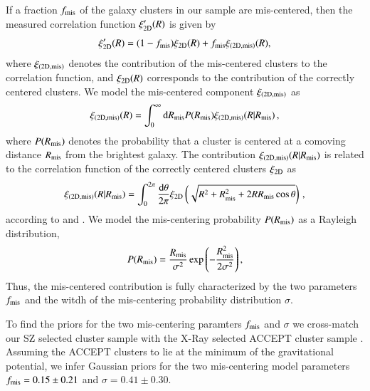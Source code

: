 \documentclass[iop, apjl, twocolappendix, numberedappendix]{emulateapj}
\begin{document}
If a fraction $f_{\rm mis}$ of the galaxy clusters in our sample are
mis-centered, then the measured correlation function $\xi'_{\rm
2D}(R)$ is given by
% 
%
\begin{equation} 
\xi'_{\rm 2D}(R) = (1-f_{\rm mis})\xi_{\rm 2D}(R)+f_{\rm mis}\xi_{\rm
(2D,mis)}(R)\\,
\label{eq:full}
\end{equation}
where $\xi_{\rm (2D,mis)}$ denotes the contribution of the
mis-centered clusters to the correlation function, and $\xi_{\rm
2D}(R)$ corresponds to the contribution of the correctly centered
clusters. We model the mis-centered component $\xi_{\rm (2D,mis)}$ as
\begin{equation}
\xi_{\rm (2D,mis)}(R)=\int_0^\infty \mathrm{d}R_{\rm mis} P(R_{\rm
mis})\xi_{\rm (2D,mis)}(R|R_{\rm mis})\,,
\end{equation}
where $P(R_{\rm mis})$ denotes the probability that a cluster is
centered at a comoving distance $R_{\rm mis}$ from the brightest
galaxy. The contribution $\xi_{\rm (2D,mis)}(R|R_{\rm mis})$ is
related to the correlation function of the correctly centered clusters
$\xi_{\rm 2D}$ as
\begin{equation}
\xi_{\rm (2D,mis)}(R|R_{\rm
mis})=\int_0^{2\pi}\frac{\mathrm{d}\theta}{2\pi}\xi_{\rm
2D}\left(\sqrt{R^2+R_{\rm mis}^2+2RR_{\rm mis}\cos{\theta}}\right)\,,
\end{equation}
according to \citet{yang2006weak} and \citet{johnston2007cross}. We
model the mis-centering probability $P(R_{\rm mis})$ as a Rayleigh
distribution,
\begin{equation}
P(R_{\rm mis})=\frac{R_{\rm mis}}{\sigma^2}\exp{\left( -\frac{R_{\rm
mis}^2}{2\sigma^2}\right)}\,,
\end{equation}
Thus, the mis-centered contribution is fully characterized by the
two parameters $f_{\rm mis}$ and the witdh of the mis-centering
probability distribution $\sigma$.

To find the priors for the two mis-centering paramters $f_{\rm mis}$
and $\sigma$ we cross-match our SZ selected cluster sample with the
X-Ray selected ACCEPT cluster sample \citep{cavagnolo2009vizier}.
Assuming the ACCEPT clusters to lie at the minimum of the
gravitational potential, we infer Gaussian priors for the two
mis-centering model parameters $f_{\rm mis}=0.15\pm0.21$ and
$\sigma=0.41\pm0.30$.
\end{document}
